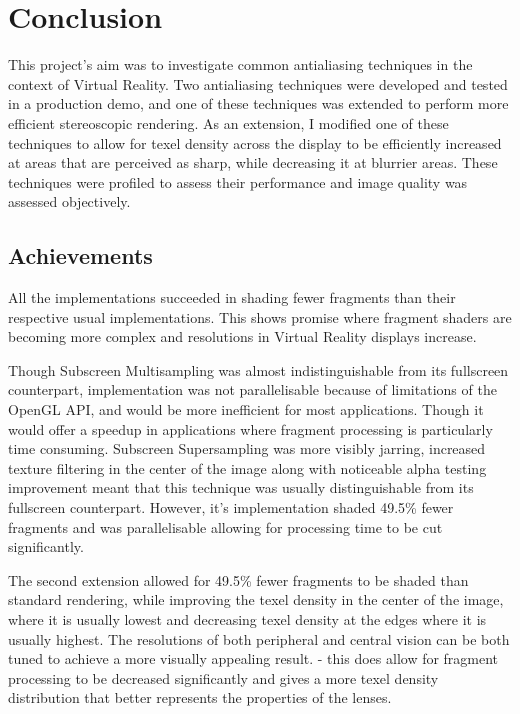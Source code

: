 \documentclass[12pt,a4paper,twoside,openright]{report}
\begin{document}
\chapter{Conclusion}

This project's aim was to investigate common antialiasing techniques in the context of Virtual Reality. Two antialiasing techniques were developed and tested in a production demo, and one of these techniques was extended to perform more efficient stereoscopic rendering. As an extension, I modified one of these techniques to allow for texel density across the display to be efficiently increased at areas that are perceived as sharp, while decreasing it at blurrier areas. These techniques were profiled to assess their performance and image quality was assessed objectively.  

\section{Achievements}

All the implementations succeeded in shading fewer fragments than their respective usual implementations.
This shows promise where fragment shaders are becoming more complex and resolutions in Virtual Reality displays increase. \par

Though Subscreen Multisampling was almost indistinguishable from its fullscreen counterpart, implementation was not parallelisable because of limitations of the OpenGL API, and would be more inefficient for most applications. Though it would offer a speedup in applications where fragment processing is particularly time consuming.
Subscreen Supersampling was more visibly jarring, increased texture filtering in the center of the image along with noticeable alpha testing improvement meant that this technique was usually distinguishable from its fullscreen counterpart.
However, it's implementation shaded 49.5\% fewer fragments and was parallelisable allowing for processing time to be cut significantly. \par

The second extension allowed for 49.5\% fewer fragments to be shaded than standard rendering, while improving the texel density in the center of the image, where it is usually lowest and decreasing texel density at the edges where it is usually highest. The resolutions of both peripheral and central vision can be both tuned to achieve a more visually appealing result. - this does allow for fragment processing to be decreased significantly and gives a more texel density distribution that better represents the properties of the lenses. \par
\end{document}
